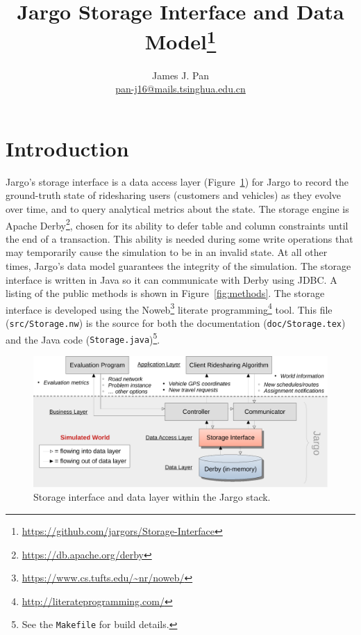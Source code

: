 \documentclass{article}
\title{Jargo Storage Interface and Data Model\footnote{
  \url{https://github.com/jargors/Storage-Interface}}}
\author{James J. Pan\\
  \small{\href{mailto:pan-j16@mails.tsinghua.edu.cn}{pan-j16@mails.tsinghua.edu.cn}}}
\theoremstyle{definition}                   %
\begin{document}
\maketitle
\pagestyle{noweb}

\tableofcontents

\section{Introduction}
\label{sec:introduction}
Jargo's storage interface is a data access layer (Figure~\ref{fig:storage}) for
Jargo to record the ground-truth state of ridesharing users (customers and
vehicles) as they evolve over time, and to query analytical metrics about the
state.  The storage engine is Apache
Derby\footnote{\url{https://db.apache.org/derby}}, chosen for its ability to
defer table and column constraints until the end of a transaction.  This
ability is needed during some write operations that may temporarily cause the
simulation to be in an invalid state. At all other times, Jargo's data model
guarantees the integrity of the simulation. The storage interface is written in
Java so it can communicate with Derby using JDBC. A listing of the public
methods is shown in Figure~\ref{fig:methods}.  The storage interface is
developed using the Noweb\footnote{\url{https://www.cs.tufts.edu/~nr/noweb/}}
literate programming\footnote{\url{http://literateprogramming.com/}} tool.
This file ({\tt{}src/Storage.nw}) is the source for both the documentation
({\tt{}doc/Storage.tex}) and the Java code ({\tt{}Storage.java})\footnote{See the
{\tt{}Makefile} for build details.}.

\begin{figure}[h]
\centering
\includegraphics[width=150mm]{src/fig/storage-fig}
\caption{Storage interface and data layer within the Jargo stack.}
\label{fig:storage}
\end{figure}
\end{document}

